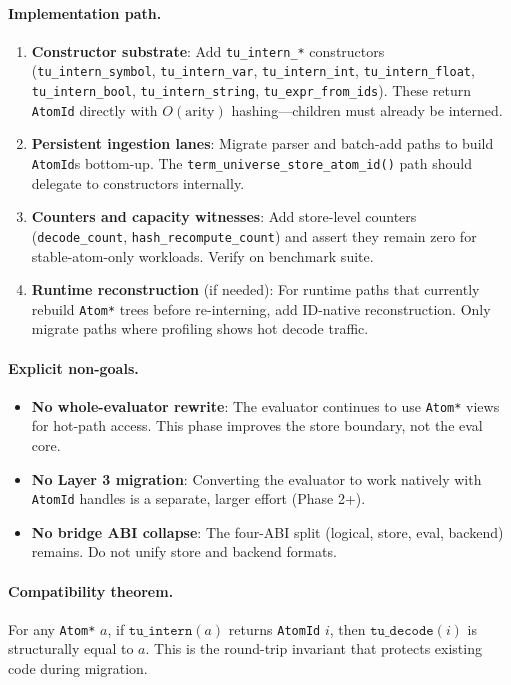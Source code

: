 \documentclass[11pt]{article}
\newcommand{\code}[1]{\texttt{#1}}
\begin{document}
\paragraph{Implementation path.}
\begin{enumerate}
\item \textbf{Constructor substrate}: Add \code{tu\_intern\_*} constructors
  (\code{tu\_intern\_symbol}, \code{tu\_intern\_var}, \code{tu\_intern\_int},
  \code{tu\_intern\_float}, \code{tu\_intern\_bool}, \code{tu\_intern\_string},
  \code{tu\_expr\_from\_ids}).  These return \code{AtomId} directly with
  $O(\mathrm{arity})$ hashing---children must already be interned.
\item \textbf{Persistent ingestion lanes}: Migrate parser and batch-add paths
  to build \code{AtomId}s bottom-up.  The \code{term\_universe\_store\_atom\_id()}
  path should delegate to constructors internally.
\item \textbf{Counters and capacity witnesses}: Add store-level counters
  (\code{decode\_count}, \code{hash\_recompute\_count}) and assert they remain
  zero for stable-atom-only workloads.  Verify on benchmark suite.
\item \textbf{Runtime reconstruction} (if needed): For runtime paths that
  currently rebuild \code{Atom*} trees before re-interning, add ID-native
  reconstruction.  Only migrate paths where profiling shows hot decode traffic.
\end{enumerate}

\paragraph{Explicit non-goals.}
\begin{itemize}
\item \textbf{No whole-evaluator rewrite}: The evaluator continues to use
  \code{Atom*} views for hot-path access.  This phase improves the store
  boundary, not the eval core.
\item \textbf{No Layer 3 migration}: Converting the evaluator to work natively
  with \code{AtomId} handles is a separate, larger effort (Phase 2+).
\item \textbf{No bridge ABI collapse}: The four-ABI split (logical, store,
  eval, backend) remains.  Do not unify store and backend formats.
\end{itemize}

\paragraph{Compatibility theorem.}
For any \code{Atom*} $a$, if $\code{tu\_intern}(a)$ returns \code{AtomId} $i$,
then $\code{tu\_decode}(i)$ is structurally equal to $a$.  This is the round-trip
invariant that protects existing code during migration.
\end{document}

